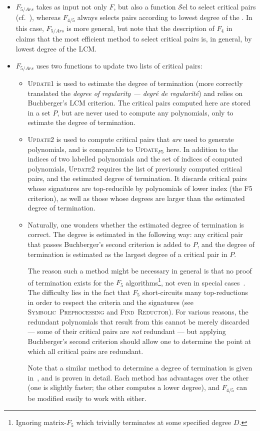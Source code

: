 \begin{itemize}
\item $F_{5/Ars}$ takes as input not only $F$, but also a function $\mathcal{S}$el to select critical pairs (cf.~\cite{f4}), whereas $F_{4/5}$ always selects pairs according to lowest degree of the \LCM. In this case, $F_{5/Ars}$ is more general, but note that the description of $F_4$ in~\cite{f4} claims that the most efficient method to select critical pairs is, in general, by lowest degree of the LCM.
\item $F_{5/Ars}$ uses two functions to update two lists of critical pairs:
  \begin{itemize}
  \item \textsc{Update1} is used to estimate the degree of termination (more correctly translated the \emph{degree of regularity --- degr{\'e} de regularit{\'e}}) and relies on Buchberger's LCM criterion. The critical pairs computed here are stored in a set $P$, but are never used to compute any polynomials, only to estimate the degree of termination.
  \item \textsc{Update2} is used to compute critical pairs that \emph{are} used to generate polynomials, and is comparable to \textsc{Update}$_{F5}$ here. In addition to the indices of two labelled polynomials and the set of indices of computed polynomials, \textsc{Update2} requires the list of previously computed critical pairs, and the estimated degree of termination. It discards critical pairs whose signatures are top-reducible by polynomials of lower index (the F5 criterion), as well as those whose degrees are larger than the estimated degree of termination.

\item Naturally, one wonders whether the estimated degree of termination is correct. The degree is estimated in the following way: any critical pair that passes Buchberger's second criterion is added to $P$, and the degree of termination is estimated as the largest degree of a critical pair in $P$.
    
  The reason such a method might be necessary in general is that no proof of termination exists for the $F_5$ algorithms\footnote{Ignoring matrix-$F_5$ which trivially terminates at some specified degree $D$.}, not even in special cases~\cite{Gash2008}. The difficulty lies in the fact that $F_5$ short-circuits many top-reductions in order to respect the criteria and the signatures (see \textsc{Symbolic\ Preprocessing} and \textsc{Find\ Reductor}). For various reasons, the redundant polynomials that result from this cannot be merely discarded --- some of their critical pairs are \emph{not} redundant --- but applying Buchberger's second criterion should allow one to determine the point at which all critical pairs are redundant.
    
    Note that a similar method to determine a degree of termination is given in~\cite{ederperry:f5+}, and is proven in detail. Each method has advantages over the other (one is slightly faster; the other computes a lower degree), and $F_{4/5}$ can be modified easily to work with either.
  \end{itemize}
\end{itemize}

